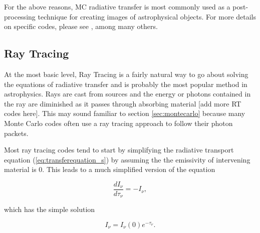 For the above reasons, MC radiative transfer is most commonly used as a post-processing technique for creating images of astrophysical objects. For more details on specific codes, please see \citet{dullemond12,cantalupoPorciani11,altayPelupessyCroft08,ercolanoEt03,nenkovaEt99,lucy99,harriesHowarth97}, among many others.




\subsection{Ray Tracing}
\label{sec:raytracing}

At the most basic level, Ray Tracing is a fairly natural way to go about solving the equations of radiative transfer and is probably the most popular method in astrophysics. Rays are cast from sources and the energy or photons contained in the ray are diminished as it passes through absorbing material \citep{razoumovScott99,abelNormanMadau99} [add more RT codes here]. This may sound familiar to section \ref{sec:montecarlo} because many Monte Carlo codes often use a ray tracing approach to follow their photon packets.

Most ray tracing codes tend to start by simplifying the radiative transport equation (\ref{eq:transferequation_s}) by assuming the the emissivity of intervening material is 0. This leads to a much simplified version of the equation

\begin{equation}
\label{eq:transferequation_abs}
\frac{dI_{\nu}}{d\tau_{\nu}} = -I_{\nu},
\end{equation}

which has the simple solution

\begin{equation}
\label{eq:transfersolution_abs}
I_{\nu} = I_{\nu}(0)e^{-\tau_{\nu}}.
\end{equation}

